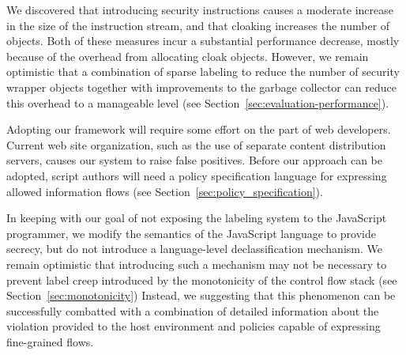 We discovered that introducing security instructions causes a moderate increase in the size of the instruction stream, and that cloaking increases the number of objects.
Both of these measures incur a substantial performance decrease, mostly because of the overhead from allocating cloak objects.
However, we remain optimistic that a combination of sparse labeling to reduce the number of security wrapper objects together with improvements to the garbage collector can reduce this overhead to a manageable level (see Section~\ref{sec:evaluation-performance}).

Adopting our framework will require some effort on the part of web developers.
Current web site organization, such as the use of separate content distribution servers, causes our system to raise false positives.
Before our approach can be adopted, script authors will need a policy specification language for expressing allowed information flows (see Section~\ref{sec:policy_specification}).

\begin{comment}
\begin{jscbytecode}
|\tikzmark{mylabelStart1}|[   0] enter|\tikzmark{mylabelEnd1}|
|\tikzmark{mylabelStart2}|[   0] enter|\tikzmark{mylabelEnd2}|
|\tikzmark{mylabelStart3}|[   0] enter|\tikzmark{mylabelEnd3}|
|\tikzmark{mylabelStart4}|[   0] enter|\tikzmark{mylabelEnd4}|
|\tikzmark{mylabelStart5}|[   0] enter|\tikzmark{mylabelEnd5}|
\end{jscbytecode}

\begin{tikz}[overlay, remember picture] {
  \draw[->, thick] ($(mylabelStart1)$) -- ($(mylabelEnd5)$);
}
\end{tikz}
\end{comment}


In keeping with our goal of not exposing the labeling system to the JavaScript programmer, we modify the semantics of the JavaScript language to provide secrecy, but do not introduce a language-level declassification mechanism.
We remain optimistic that introducing such a mechanism may not be necessary to prevent label creep introduced by the monotonicity of the control flow stack (see Section~\ref{sec:monotonicity})
Instead, we suggesting that this phenomenon can be successfully combatted with a combination of detailed information about the violation provided to the host environment and policies capable of expressing fine-grained flows.


